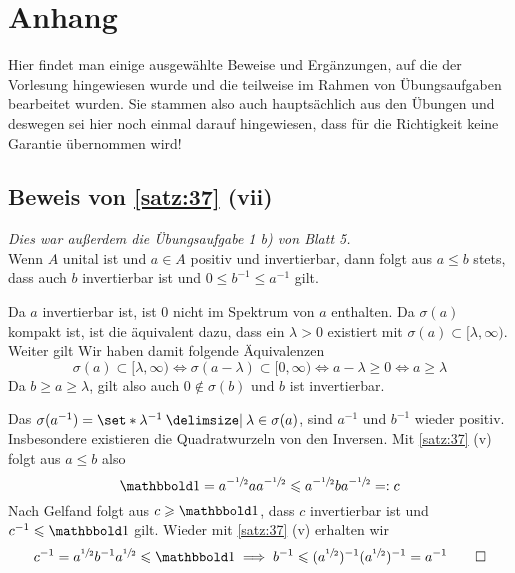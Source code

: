 \section{Anhang} %
\label{sec:anhang}
Hier findet man einige ausgewählte Beweise und Ergänzungen, auf die der Vorlesung hingewiesen wurde und die teilweise im Rahmen von Übungsaufgaben bearbeitet wurden.
Sie stammen also auch hauptsächlich aus den Übungen und deswegen sei hier noch einmal darauf hingewiesen, dass für die Richtigkeit keine Garantie übernommen wird!


\subsection{Beweis von \autoref{satz:37} (vii)} %
\label{sub:beweis_37_vii}
\emph{Dies war außerdem die Übungsaufgabe 1 b) von Blatt 5.} \smallskip\\
Wenn $A$ unital ist und $a \in A$ positiv und invertierbar, dann folgt aus $a \le b$ stets, dass auch $b$ invertierbar ist und $0 \le b^{-1} \le a^{-1}$ gilt.
\begin{beweis}
	Da $a$ invertierbar ist, ist $0$ nicht im Spektrum von $a$ enthalten.
	Da $\sigma(a)$ kompakt ist, ist die äquivalent dazu, dass ein $\lambda>0$ existiert mit $\sigma(a) \subset [\lambda,\infty)$.
	Weiter gilt
	Wir haben damit folgende Äquivalenzen
	\[
		\sigma(a) \subset [\lambda,\infty) \iff \sigma(a-\lambda) \subset [0,\infty) \iff a- \lambda\ge 0 \iff a \ge \lambda
	\]
	Da $b\ge a \ge \lambda$, gilt also auch $0 \notin \sigma(b)$ und $b$ ist invertierbar.
	
	Das $\sigma(a^{-1}) = \set*{\lambda^{-1} \given \lambda \in  \sigma(a)}$, sind $a^{-1}$ und $b ^{-1}$ wieder positiv.
	Insbesondere existieren die Quadratwurzeln von den Inversen. 
	Mit \autoref{satz:37} (v) folgt aus $a \le b$ also 
	\[
		\ind=a^{-\sfrac{1}{2}} a a^{- \sfrac{1}{2}} \le a^{-\sfrac{1}{2}} b a^{-\sfrac{1}{2}} =: c
	\]
	Nach Gelfand folgt aus $c \ge \ind$, dass $c$ invertierbar ist und $c^{-1} \le \ind$ gilt. Wieder mit \autoref{satz:37} (v) erhalten wir
	\[
		c^{-1} = a^{\sfrac{1}{2}}b^{-1}a^{\sfrac{1}{2}} \le \ind \implies b^{-1} \le \enbrace{a^{\sfrac{1}{2}}}^{-1} \enbrace{a^{\sfrac{1}{2}}}^{-1} =a^{-1} \qedhere
	\]
\end{beweis}


